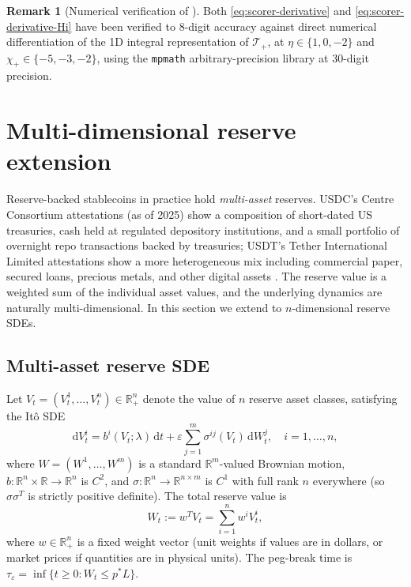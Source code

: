 \documentclass[11pt,a4paper]{article}
\theoremstyle{plain}
\theoremstyle{definition}
\newtheorem{remark}[theorem]{Remark}
\newcommand{\R}{\mathbb{R}}
\newcommand{\eps}{\varepsilon}
\renewcommand{\d}{\mathrm{d}}
\begin{document}
\begin{remark}[Numerical verification of ]
Both \eqref{eq:scorer-derivative} and \eqref{eq:scorer-derivative-Hi} have been verified to 8-digit accuracy against direct numerical differentiation of the 1D integral representation of $\mathcal T_+$, at $\eta \in \{1, 0, -2\}$ and $\chi_+ \in \{-5, -3, -2\}$, using the \texttt{mpmath} arbitrary-precision library at 30-digit precision.
\end{remark}

\section{Multi-dimensional reserve extension}
\label{sec:multid}

Reserve-backed stablecoins in practice hold \emph{multi-asset} reserves. USDC's Centre Consortium attestations (as of 2025) show a composition of short-dated US treasuries, cash held at regulated depository institutions, and a small portfolio of overnight repo transactions backed by treasuries; USDT's Tether International Limited attestations show a more heterogeneous mix including commercial paper, secured loans, precious metals, and other digital assets \cite{KlagesMundtHarzGudgeonLiuMinca2020, GortonZhang2023}.
The reserve value is a weighted sum of the individual asset values, and the underlying dynamics are naturally multi-dimensional.
In this section we extend  to $n$-dimensional reserve SDEs.

\subsection{Multi-asset reserve SDE}

Let $V_t = (V^1_t,\ldots,V^n_t) \in \R^n_+$ denote the value of $n$ reserve asset classes, satisfying the It\^o SDE
\begin{equation}
    \d V^i_t = b^i(V_t;\lambda)\,\d t + \eps\sum_{j=1}^m \sigma^{ij}(V_t)\,\d W^j_t,\quad i = 1,\ldots,n,
    \label{eq:multid-sde}
\end{equation}
where $W = (W^1,\ldots,W^m)$ is a standard $\R^m$-valued Brownian motion, $b:\R^n\times\R\to\R^n$ is $C^2$, and $\sigma:\R^n\to\R^{n\times m}$ is $C^1$ with full rank $n$ everywhere (so $\sigma\sigma^T$ is strictly positive definite).
The total reserve value is
$$ W_t := w^T V_t = \sum_{i=1}^n w^i V^i_t,$$
where $w \in \R^n_+$ is a fixed weight vector (unit weights if values are in dollars, or market prices if quantities are in physical units).
The peg-break time is $\tau_\eps = \inf\{t\geq 0 : W_t \leq p^*L\}$.
\end{document}
